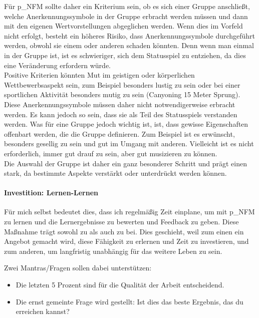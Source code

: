 Für \gls{p_NFM} sollte daher ein Kriterium sein, ob es sich einer Gruppe anschließt, welche Anerkennungssymbole in der Gruppe erbracht werden müssen und dann mit den eigenen Wertvorstellungen abgeglichen werden. Wenn dies im Vorfeld nicht erfolgt, besteht ein höheres Risiko, dass Anerkennungssymbole durchgeführt werden, obwohl sie einem oder anderen schaden könnten. Denn wenn man einmal in der Gruppe ist, ist es schwieriger, sich dem Statusspiel zu entziehen, da dies eine Veränderung erfordern würde.\\


Positive Kriterien könnten Mut im geistigen oder körperlichen Wettbewerbsaspekt sein, zum Beispiel besonders lustig zu sein oder bei einer sportlichen Aktivität besonders mutig zu sein (Canyoning 15 Meter Sprung).\\


Diese Anerkennungssymbole müssen daher nicht notwendigerweise erbracht werden. Es kann jedoch so sein, dass sie als Teil des Statusspiels verstanden werden. Was für eine Gruppe jedoch wichtig ist, ist, dass gewisse Eigenschaften offenbart werden, die die Gruppe definieren. Zum Beispiel ist es erwünscht, besonders gesellig zu sein und gut im Umgang mit anderen. Vielleicht ist es nicht erforderlich, immer gut drauf zu sein, aber gut musizieren zu können.\\


Die Auswahl der Gruppe ist daher ein ganz besonderer Schritt und prägt einen stark, da bestimmte Aspekte verstärkt oder unterdrückt werden können.

\paragraph{Investition: Lernen-Lernen}

Für mich selbst bedeutet dies, dass ich regelmäßig Zeit einplane, um mit \gls{p_NFM} zu lernen und die Lernergebnisse zu bewerten und Feedback zu geben. Diese Maßnahme trägt sowohl zu \NFMOOne als auch zu \NFMOThree bei. Dies geschieht, weil zum einen ein Angebot gemacht wird, diese Fähigkeit zu erlernen und Zeit zu investieren, und zum anderen, um langfristig unabhängig für das weitere Leben zu sein.

Zwei Mantras/Fragen sollen dabei unterstützen:
\begin{itemize}
	\item Die letzten 5 Prozent sind für die Qualität der Arbeit entscheidend.
	\item Die ernst gemeinte Frage wird gestellt: Ist dies das beste Ergebnis, das du erreichen kannst?
\end{itemize}

